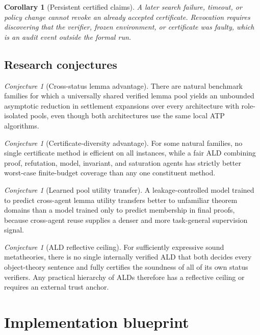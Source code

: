 \documentclass[11pt]{article}
\newtheorem{corollary}[theorem]{Corollary}
\theoremstyle{definition}
\theoremstyle{remark}
\newtheorem{conjecture}[theorem]{Conjecture}
\begin{document}
\begin{corollary}[Persistent certified claims]
A later search failure, timeout, or policy change cannot revoke an already accepted certificate. Revocation requires discovering that the verifier, frozen environment, or certificate was faulty, which is an audit event outside the formal run.
\end{corollary}

\subsection{Research conjectures}
\begin{conjecture}[Cross-status lemma advantage]
There are natural benchmark families for which a universally shared verified lemma pool yields an unbounded asymptotic reduction in settlement expansions over every architecture with role-isolated pools, even though both architectures use the same local ATP algorithms.
\end{conjecture}

\begin{conjecture}[Certificate-diversity advantage]
For some natural families, no single certificate method is efficient on all instances, while a fair ALD combining proof, refutation, model, invariant, and saturation agents has strictly better worst-case finite-budget coverage than any one constituent method.
\end{conjecture}

\begin{conjecture}[Learned pool utility transfer]
A leakage-controlled model trained to predict cross-agent lemma utility transfers better to unfamiliar theorem domains than a model trained only to predict membership in final proofs, because cross-agent reuse supplies a denser and more task-general supervision signal.
\end{conjecture}

\begin{conjecture}[ALD reflective ceiling]
For sufficiently expressive sound metatheories, there is no single internally verified ALD that both decides every object-theory sentence and fully certifies the soundness of all of its own status verifiers. Any practical hierarchy of ALDs therefore has a reflective ceiling or requires an external trust anchor.
\end{conjecture}

\section{Implementation blueprint}
\end{document}
